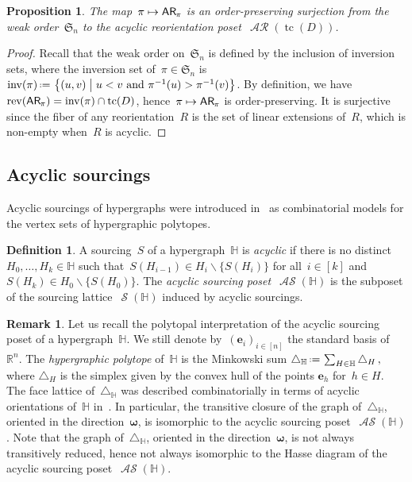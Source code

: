 \documentclass{amsart}
\newtheorem{proposition}[theorem]{Proposition}
\theoremstyle{definition}
\newtheorem{definition}[theorem]{Definition}
\newtheorem{remark}[theorem]{Remark}
\newcommand{\R}{\mathbb{R}} %
\renewcommand{\b}[1]{\boldsymbol{#1}} %
\renewcommand{\c}[1]{\mathcal{#1}} %
\newcommand{\set}[2]{\left\{ #1 \;\middle|\; #2 \right\}} %
\newcommand{\ssm}{\smallsetminus} %
\newcommand{\eqdef}{\mbox{\,\raisebox{0.2ex}{\scriptsize\ensuremath{\mathrm:}}\ensuremath{=}\,}} %
\newcommand{\simplex}{\triangle} %
\DeclareMathOperator{\inv}{inv} %
\DeclareMathOperator{\tc}{tc} %
\newcommand{\darkblue}{\color{darkblue}} %
\newcommand{\defn}[1]{\textsl{\darkblue #1}} %
\newcommand{\fS}{\mathfrak{S}} %
\newcommand{\mymap}[2]{\mathsf{#1}_{\hspace{-.7pt}#2}}
\DeclareMathOperator{\AReori}{\c{AR}}  %
\newcommand{\areori}[1]{\mymap{AR}{#1}}  %
\DeclareMathOperator{\rev}{rev} %
\DeclareMathOperator{\Sour}{\mathcal{S}}  %
\DeclareMathOperator{\ASour}{\mathcal{AS}}  %
\newcommand{\HH}{\mathbb H}  %
\begin{document}
\begin{proposition}
The map~$\pi \mapsto \areori{\pi}$ is an order-preserving surjection from the weak order~$\fS_n$ to the acyclic reorientation poset~$\AReori(\tc(D))$.
\end{proposition}

\begin{proof}
Recall that the weak order on~$\fS_n$ is defined by the inclusion of inversion sets, where the inversion set of~$\pi \in \fS_n$ is~$\inv(\pi) \eqdef \set{(u,v)}{u < v \text{ and } \pi^{-1}(u) > \pi^{-1}(v)}$.
By definition, we have~$\rev(\areori{\pi}) = \inv(\pi) \cap \tc(D)$, hence~$\pi \mapsto \areori{\pi}$ is order-preserving.
It is surjective since the fiber of any reorientation~$R$ is the set of linear extensions of~$R$, which is non-empty when~$R$ is acyclic.
\end{proof}

\subsection{Acyclic sourcings}

Acyclic sourcings of hypergraphs were introduced in~\cite{BenedettiBergeronMachacek,BergeronPilaud} as combinatorial models for the vertex sets of hypergraphic polytopes.

\begin{definition}
A sourcing~$S$ of a hypergraph~$\HH$ is \defn{acyclic} if there is no distinct~$H_0, \dots, H_k \in \HH$ such that~$S(H_{i-1}) \in H_i \ssm \{S(H_i)\}$ for all~$i \in [k]$ and~$S(H_k) \in H_0 \ssm \{S(H_0)\}$.
The \defn{acyclic sourcing poset}~$\ASour(\HH)$ is the subposet of the sourcing lattice~$\Sour(\HH)$ induced by acyclic sourcings.
\end{definition}

\begin{remark}
Let us recall the polytopal interpretation of the acyclic sourcing poset of a hypergraph~$\HH$.
We still denote by~$(\b{e}_i)_{i \in [n]}$ the standard basis of~$\R^n$.
The \defn{hypergraphic polytope} of~$\HH$ is the Minkowski sum
\(
\simplex_\HH \eqdef \sum_{H\in \HH} \simplex_H\,,
\)
where $\simplex_H$ is the simplex given by the convex hull of the points $\b{e}_h$ for~$h \in H$.
The face lattice of~$\simplex_\HH$ was described combinatorially in terms of acyclic orientations of~$\HH$ in~\cite{BenedettiBergeronMachacek}.
In particular, the transitive closure of the graph of~$\simplex_\HH$, oriented in the direction~$\b{\omega}$, is isomorphic to the acyclic sourcing poset~$\ASour(\HH)$.
Note that the graph of~$\simplex_\HH$, oriented in the direction~$\b{\omega}$, is not always transitively reduced, hence not always isomorphic to the Hasse diagram of the acyclic sourcing poset~$\ASour(\HH)$.
\end{remark}
\end{document}

